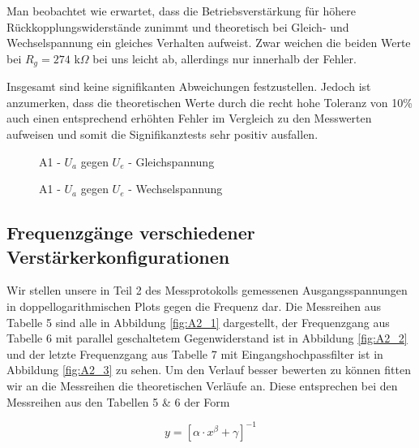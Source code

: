 \documentclass{article}
\begin{document}
\phantom{.}

Man beobachtet wie erwartet, dass die Betriebsverstärkung für höhere Rückkopplungswiderstände zunimmt und theoretisch bei Gleich- und Wechselspannung ein gleiches Verhalten aufweist. Zwar weichen die beiden Werte bei $R_g = 274$ k$\Omega$ bei uns leicht ab, allerdings nur innerhalb der Fehler. 

Insgesamt sind keine signifikanten Abweichungen festzustellen. Jedoch ist anzumerken, dass die theoretischen Werte durch die recht hohe Toleranz von 10\% auch einen entsprechend erhöhten Fehler im Vergleich zu den Messwerten aufweisen und somit die Signifikanztests sehr positiv ausfallen.  

\begin{figure}[!p]
  \centering
  \hfill
  \hfill
  \caption{A1 - $U_a$ gegen $U_e$ - Gleichspannung}
  \label{fig:A1_gleichspannung}
\end{figure}

\begin{figure}[!p]
  \centering
  \hfill
  \hfill
  \caption{A1 - $U_a$ gegen $U_e$ - Wechselspannung}
  \label{fig:A1_wechselspannung}
\end{figure}

\clearpage
\newpage
\subsection{Frequenzgänge verschiedener Verstärkerkonfigurationen}

Wir stellen unsere in Teil 2 des Messprotokolls gemessenen Ausgangsspannungen in doppellogarithmischen Plots gegen die Frequenz dar. Die Messreihen aus Tabelle 5 sind alle in Abbildung \ref{fig:A2_1} dargestellt, der Frequenzgang aus Tabelle 6 mit parallel geschaltetem Gegenwiderstand ist in Abbildung \ref{fig:A2_2} und der letzte Frequenzgang aus Tabelle 7 mit Eingangshochpassfilter ist in Abbildung \ref{fig:A2_3} zu sehen. Um den Verlauf besser bewerten zu können fitten wir an die Messreihen die theoretischen Verläufe an. Diese entsprechen bei den Messreihen aus den Tabellen 5 \& 6 der Form

\begin{equation}
    y = \left[ \alpha \cdot x^\beta + \gamma \right]^{-1}
\end{equation}
\end{document}
